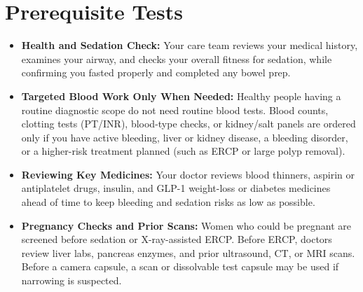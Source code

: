 \section{Prerequisite Tests}
\begin{itemize}
\item \textbf{Health and Sedation Check:} Your care team reviews your medical history, examines your airway, and checks your overall fitness for sedation, while confirming you fasted properly and completed any bowel prep.
\item \textbf{Targeted Blood Work Only When Needed:} Healthy people having a routine diagnostic scope do not need routine blood tests. Blood counts, clotting tests (PT/INR), blood-type checks, or kidney/salt panels are ordered only if you have active bleeding, liver or kidney disease, a bleeding disorder, or a higher-risk treatment planned (such as ERCP or large polyp removal).
\item \textbf{Reviewing Key Medicines:} Your doctor reviews blood thinners, aspirin or antiplatelet drugs, insulin, and GLP-1 weight-loss or diabetes medicines ahead of time to keep bleeding and sedation risks as low as possible.
\item \textbf{Pregnancy Checks and Prior Scans:} Women who could be pregnant are screened before sedation or X-ray-assisted ERCP. Before ERCP, doctors review liver labs, pancreas enzymes, and prior ultrasound, CT, or MRI scans. Before a camera capsule, a scan or dissolvable test capsule may be used if narrowing is suspected.
\end{itemize}


